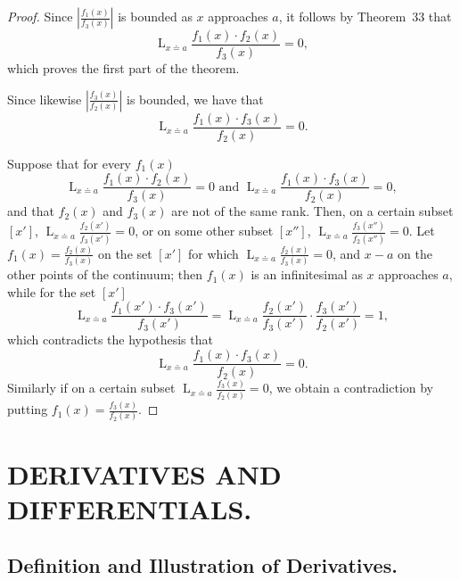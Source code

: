 \documentclass[a4paper,12pt]{book}[2004/02/16]
\providecommand{\hyperlink}[2]{#2}
\providecommand{\hypertarget}[2]{#2}
\theoremstyle{ilemma}
\theoremstyle{itheorem}
\theoremstyle{iother}
\theoremstyle{icorollary}
\theoremstyle{numcorollary}
\theoremstyle{idefinition}
\renewcommand{\dfrac}[2]{\frac{#1}{#2}}%
\begin{document}
\begin{proof}
Since $\displaystyle\left|\frac{f_1(x)}{f_3(x)} \right|$ is bounded as
$x$ approaches $a$, it follows by Theorem~\hyperlink{thm33}{33} that
\[
  \mathop{L}_{x\doteq a} \frac{f_1(x)\cdot f_2(x)}{f_3(x)} = 0,
\]
which proves the first part of the theorem.

Since likewise $\displaystyle\left|\frac{f_3(x)}{f_2(x)} \right|$ is
bounded, we have that
\[
  \mathop{L}_{x\doteq a} \frac{f_1(x)\cdot f_3(x)}{f_2(x)} = 0.
\]

Suppose that for every $f_1(x)$
\[
  \mathop{L}_{x\doteq a} \frac{f_1(x)\cdot f_2(x)}{f_3(x)} = 0
\text{ and }
  \mathop{L}_{x\doteq a} \frac{f_1(x)\cdot f_3(x)}{f_2(x)} = 0,
\]
and that $f_2(x)$ and $f_3(x)$ are not of the same rank. Then, on a
certain subset $[x']$, $\displaystyle \mathop{L}_{x\doteq a}
\frac{f_2(x')}{f_3(x')} = 0$, or on some other subset $[x'']$,
$\displaystyle \mathop{L}_{x\doteq a} \frac{f_3(x'')}{f_2(x'')} =
0$. Let $f_1(x) = \dfrac{f_2(x)}{f_3(x)}$ on the set $[x']$ for which
$\displaystyle \mathop{L}_{x\doteq a} \frac{f_2(x)}{f_3(x)} = 0$, and
$x-a$ on the other points of the continuum;
then $f_1(x)$ is an infinitesimal as $x$ approaches $a$, while for the
set $[x']$
\[
  \mathop{L}_{x \doteq a} \frac{f_1{(x')} \cdot f_3(x')}{f_3(x')} =
  \mathop{L}_{x \doteq a} \frac{f_2(x')}{f_3(x')} \cdot
  \frac{f_3(x')}{f_2(x')} = 1,
\]
which contradicts the hypothesis that
\[
  \mathop{L}_{x \doteq a} \frac{f_1(x) \cdot f_3(x)}{f_2(x)} = 0.
\]
Similarly if on a certain subset $\displaystyle{\mathop{L}_{x \doteq
a}} \dfrac{f_3(x)}{f_2(x)} = 0$, we obtain a contradiction by putting
$f_1(x) = \dfrac{f_3(x)}{f_2(x)}$.
\end{proof}


\chapter{DERIVATIVES AND DIFFERENTIALS.}\hypertarget{chapVII}{}%

\section{Definition and Illustration of Derivatives.}\hypertarget{chVIIsec1}{}%
\end{document}
